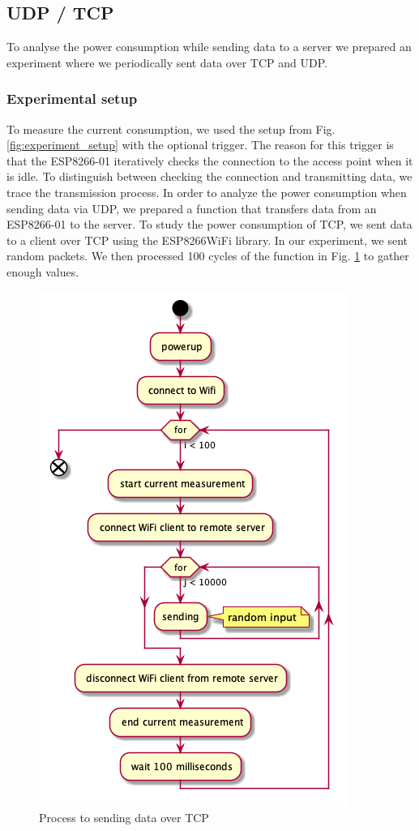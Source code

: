 \subsection{UDP / TCP}
\label{udptcp:measure}
To analyse the power consumption while sending data to a server we prepared an 
experiment where we periodically sent data over TCP and UDP.\\

\subsubsection{Experimental setup}
To measure the current consumption, we used the setup from Fig. \ref{fig:experiment_setup} 
with the optional trigger.
The reason for this trigger is that the ESP8266-01 iteratively checks the connection to the access point when it is idle.
To distinguish between checking the connection and transmitting data, we trace the transmission process.
In order to analyze the power consumption when sending data via UDP,
we prepared a function that transfers data from an ESP8266-01 to the server.
To study the power consumption of TCP,
we sent data to a client over TCP using the ESP8266WiFi library. In our experiment, we sent random packets.
We then processed 100 cycles of the function in Fig. \ref{fig:tcp_uml} to gather enough values.
\newline
\begin{figure}[H]
\centering
\includegraphics[width = 0.7 \linewidth]{fig/udp_tcp/tcp_uml.png}
\caption{Process to sending data over TCP}
\label{fig:tcp_uml}
\end{figure}
